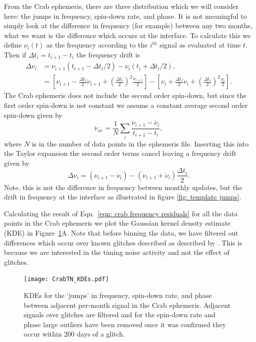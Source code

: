 \documentclass[../full_thesis/full_thesis.tex]{subfiles}
\begin{document}
\begin{subappendices}
From the Crab ephemeris, there are three distribution which
we will consider here: the jumps in
frequency, spin-down rate, and phase. It is not meaningful to simply look at
the difference in frequency (for example) between any two months, what we want
is the difference which occurs at the interface. To calculate this
we define $\nu_{i}(t)$ as the frequency according to the
$i^{th}$ signal as evaluated at time $t$. Then if $\Delta t_{i} = t_{i+1} -
t_{i}$ the frequency drift is
\begin{align}
\Delta\nu_{i} &= \nu_{i+1}\left(t_{i+1}-\Delta t_{i}/2\right) -  \nu_{i}\left(t_{i}+\Delta t_{i}/2\right), \\
    &= \left[\nu_{i+1}- \frac{\Delta t_{i}}{2}\dot{\nu}_{i+1} + \left(\frac{\Delta t_{i}}{2}\right)^{2}\frac{\ddot{\nu}_{i+1}}{2}\right]
     - \left[\nu_{i} + \frac{\Delta t_{i}}{2}\dot{\nu}_{i}+ \left(\frac{\Delta t_{i}}{2}\right)^{2}\frac{\ddot{\nu}_{i}}{2}\right] .
\end{align}
The Crab ephemeris does not include the second order spin-down, but since the
first order spin-down is not constant we assume a constant average second order
spin-down given by
\newcommand{\nuddotav}{\ddot{\nu}_{\textrm{av}}}
\begin{equation}
   \nuddotav = \frac{1}{N}\sum_{i} \frac{\dot{\nu}_{i+1} - \dot{\nu_{i}}}{t_{i+1} - t_{i}},
   \label{eqn: average second order spin-down}
\end{equation}
where $N$ is in the number of data points in the ephemeris file. Inserting this
into the Taylor expansion the second order terms cancel leaving a frequency
drift given by
\begin{equation}
\Delta\nu_{i} = \left(\nu_{i+1}- \nu_{i}\right) -  \left(\dot{\nu}_{i+1}
               + \dot{\nu}_{i}\right)\frac{\Delta t_{i}}{2}.
\label{eqn: crab frequency residuals}
\end{equation}
Note, this is not the difference in frequency between monthly
updates, but the drift in frequency at the interface as illustrated in figure
\ref{fig: template jumps}.

Calculating the result of Eqn.~\eqref{eqn: crab frequency residuals} for all
the data points in the Crab ephemeris we plot the Gaussian kernel density
estimate (KDE) in Figure~\ref{fig: crab kde}A.  Note that before binning the
data, we have filtered out differences which occur over known glitches
described as described by \citet{Espinoza2011}. This is because we are
interested in the timing noise activity and not the effect of glitches.
\begin{figure}[ht]
\centering
\texttt{[image: CrabTN\_KDEs.pdf]}
\caption{KDEs for the `jumps' in frequency, spin-down rate, and phase between
         adjacent per-month signal in the Crab ephemeris. Adjacent signals over
         glitches are filtered and for the spin-down rate and
         phase large outliers have been removed once it was confirmed they
         occur within 200 days of a glitch.}
\label{fig: crab kde}
\end{figure}


\end{subappendices}
\end{document}
